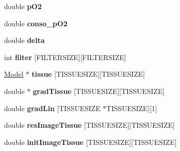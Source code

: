 \begin{DoxyCompactItemize}
\item 
double {\bfseries p\+O2}\hypertarget{classgeneric2dtissueProstate_ae83ae50c1d599018ef8c6c915cc10a6d}{}\label{classgeneric2dtissueProstate_ae83ae50c1d599018ef8c6c915cc10a6d}

\item 
double {\bfseries conso\+\_\+p\+O2}\hypertarget{classgeneric2dtissueProstate_a26d3933160f3d507736052c991b4ba4d}{}\label{classgeneric2dtissueProstate_a26d3933160f3d507736052c991b4ba4d}

\item 
double {\bfseries delta}\hypertarget{classgeneric2dtissueProstate_afd7c307e260afd706441ea2795d0928f}{}\label{classgeneric2dtissueProstate_afd7c307e260afd706441ea2795d0928f}

\item 
int {\bfseries filter} \mbox{[}F\+I\+L\+T\+E\+R\+S\+I\+ZE\mbox{]}\mbox{[}F\+I\+L\+T\+E\+R\+S\+I\+ZE\mbox{]}\hypertarget{classgeneric2dtissueProstate_ac1b1bf8651a8306e74f734ca3172fd8b}{}\label{classgeneric2dtissueProstate_ac1b1bf8651a8306e74f734ca3172fd8b}

\item 
\hyperlink{classModel}{Model} $\ast$ {\bfseries tissue} \mbox{[}T\+I\+S\+S\+U\+E\+S\+I\+ZE\mbox{]}\mbox{[}T\+I\+S\+S\+U\+E\+S\+I\+ZE\mbox{]}\hypertarget{classgeneric2dtissueProstate_a8bd15420cfc1b65a99489322fc65e6b1}{}\label{classgeneric2dtissueProstate_a8bd15420cfc1b65a99489322fc65e6b1}

\item 
double $\ast$ {\bfseries grad\+Tissue} \mbox{[}T\+I\+S\+S\+U\+E\+S\+I\+ZE\mbox{]}\mbox{[}T\+I\+S\+S\+U\+E\+S\+I\+ZE\mbox{]}\hypertarget{classgeneric2dtissueProstate_afe54e78b46c40e4352e0450af239a15d}{}\label{classgeneric2dtissueProstate_afe54e78b46c40e4352e0450af239a15d}

\item 
double {\bfseries grad\+Lin} \mbox{[}T\+I\+S\+S\+U\+E\+S\+I\+ZE $\ast$T\+I\+S\+S\+U\+E\+S\+I\+ZE\mbox{]}\mbox{[}1\mbox{]}\hypertarget{classgeneric2dtissueProstate_acfaaa00691476474ef28508202343e88}{}\label{classgeneric2dtissueProstate_acfaaa00691476474ef28508202343e88}

\item 
double {\bfseries res\+Image\+Tissue} \mbox{[}T\+I\+S\+S\+U\+E\+S\+I\+ZE\mbox{]}\mbox{[}T\+I\+S\+S\+U\+E\+S\+I\+ZE\mbox{]}\hypertarget{classgeneric2dtissueProstate_a971de6f4a4aa355d14976a89ebf4dc3a}{}\label{classgeneric2dtissueProstate_a971de6f4a4aa355d14976a89ebf4dc3a}

\item 
double {\bfseries init\+Image\+Tissue} \mbox{[}T\+I\+S\+S\+U\+E\+S\+I\+ZE\mbox{]}\mbox{[}T\+I\+S\+S\+U\+E\+S\+I\+ZE\mbox{]}\hypertarget{classgeneric2dtissueProstate_ae5ac21ce31c467a2176aa09b33b6e210}{}\label{classgeneric2dtissueProstate_ae5ac21ce31c467a2176aa09b33b6e210}


\end{DoxyCompactItemize}
